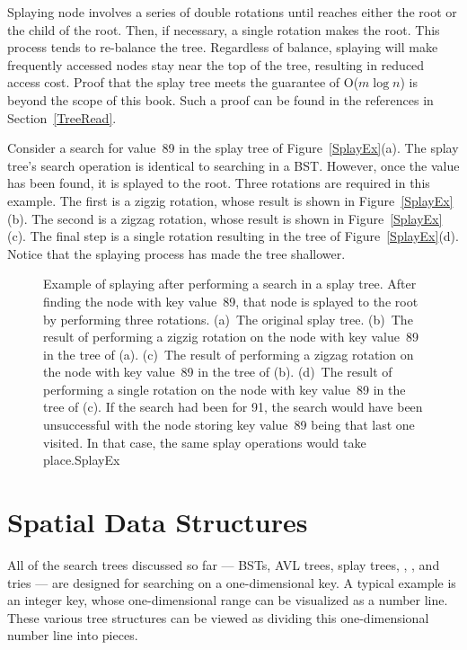 Splaying node  involves a series of double rotations until
 reaches either the root or the child of the root.
Then, if necessary, a single rotation makes  the root.
This process tends to re-balance the tree.
Regardless of balance, splaying will make frequently accessed nodes
stay near the top of the tree, resulting in reduced access cost.
Proof that the splay tree meets the guarantee of
O($m \log n$) is beyond the scope of this book.
Such a proof can be found in the references in Section~\ref{TreeRead}.

\begin{example}
Consider a search for
value~89 in the splay tree of Figure~\ref{SplayEx}(a).
The splay tree's search operation is identical to searching in
a BST.
However, once the value has been found, it is splayed to the root.
Three rotations are required in this example.
The first is a zigzig rotation, whose result is shown in
Figure~\ref{SplayEx}(b).
The second is a zigzag rotation, whose result is shown in
Figure~\ref{SplayEx}(c).
The final step is a single rotation resulting in the tree of
Figure~\ref{SplayEx}(d).
Notice that the splaying process has made the tree shallower.
\end{example}

\begin{figure}
\vspace{1pt}
{Example of splaying after performing a search in a splay tree.
After finding the node with key value~89, that node is splayed to the
root by performing three rotations.
(a)~The original splay tree.
(b)~The result of performing a zigzig rotation on the node with
key value~89 in the tree of (a).
(c)~The result of performing a zigzag rotation on the node with
key value~89 in the tree of (b).
(d)~The result of performing a single rotation on the node with
key value~89 in the tree of (c).
If the search had been for 91, the search would have been unsuccessful
with the node storing key value~89 being that last one visited.
In that case, the same splay operations would take place.}{SplayEx}
\end{figure}

\section{Spatial Data Structures}
\label{Spatial}

All
of the search trees discussed so far ---
BSTs, AVL trees, splay trees, \TTtrees, \Btrees, and tries ---
are designed for searching on a one-dimensional key.
A typical example is an integer key, whose one-dimensional range
can be visualized as a number line.
These various tree structures can be viewed as dividing this
one-dimensional number line into pieces.

